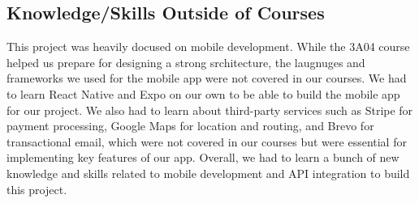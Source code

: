 \documentclass{article}
\begin{document}
\subsection{Knowledge/Skills Outside of Courses}

This project was heavily docused on mobile development. While the 3A04 course helped us prepare for designing a strong srchitecture, the laugnuges and frameworks we used for the mobile app were not covered in our courses.
We had to learn React Native and Expo on our own to be able to build the mobile app for our project.
We also had to learn about third-party services such as Stripe for payment processing, Google Maps for location and routing, and Brevo for transactional email, which were not covered in our courses but were essential for implementing key features of our app.
Overall, we had to learn a bunch of new knowledge and skills related to mobile development and API integration to build this project.
\end{document}
